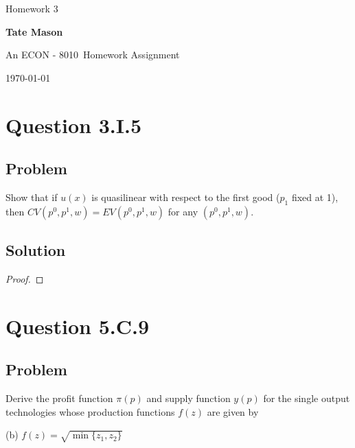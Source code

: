 \documentclass[10pt, a4paper]{article}
\newcommand\course{ECON - 8010}                            %
\newcommand\hwnumber{ 3}                                 %
\newcommand\Information{Tate Mason}                        %
\begin{document}
  \begin{titlepage}
    \begin{center}
      \vspace*{3cm}
            
        \vspace{1cm}
        \huge
        Homework \hwnumber
            
        \vspace{1.5cm}
        \Large
            
        \textbf{\Information}                      %
            
        \vfill
        
        An \course \ Homework Assignment
            
        \vspace{1cm}
        \Large

        
        \today
            
    \end{center}
  \end{titlepage}

  \newpage

  \section{Question 3.I.5}
    \subsection*{Problem}
      Show that if $u(x)$ is quasilinear with respect to the first good ($p_1$ fixed at 1), then $CV(p^0,p^1,w)=EV(p^0,p^1,w)$ for any $(p^0,p^1,w)$.
    \subsection*{Solution}
    \begin{proof}
    \end{proof}
  \section{Question 5.C.9}
    \subsection*{Problem}
      Derive the profit function $\pi(p)$ and supply function $y(p)$ for the single output technologies whose production functions $f(z)$ are given by

      (b) $f(z)=\sqrt{\min\{z_1,z_2\}}$
\end{document}
